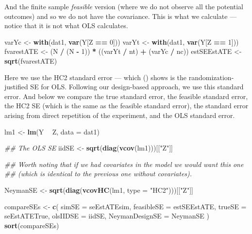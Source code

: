 \documentclass[
  12pt,
]{book}
\newenvironment{Shaded}{\begin{snugshade}}{\end{snugshade}}
\newcommand{\CommentTok}[1]{\textcolor[rgb]{0.56,0.35,0.01}{\textit{#1}}}
\newcommand{\DataTypeTok}[1]{\textcolor[rgb]{0.13,0.29,0.53}{#1}}
\newcommand{\DecValTok}[1]{\textcolor[rgb]{0.00,0.00,0.81}{#1}}
\newcommand{\KeywordTok}[1]{\textcolor[rgb]{0.13,0.29,0.53}{\textbf{#1}}}
\newcommand{\NormalTok}[1]{#1}
\newcommand{\OperatorTok}[1]{\textcolor[rgb]{0.81,0.36,0.00}{\textbf{#1}}}
\newcommand{\StringTok}[1]{\textcolor[rgb]{0.31,0.60,0.02}{#1}}
\theoremstyle{definition}
\theoremstyle{definition}
\theoremstyle{definition}
\theoremstyle{remark}
\begin{document}
And the finite sample \emph{feasible} version (where we do not observe
all the potential outcomes) and so we do not have the covariance. This
is what we calculate --- notice that it is not what OLS calculates.

\begin{Shaded}
\begin{Highlighting}[]
\NormalTok{varYc <-}\StringTok{ }\KeywordTok{with}\NormalTok{(dat1, }\KeywordTok{var}\NormalTok{(Y[Z }\OperatorTok{==}\StringTok{ }\DecValTok{0}\NormalTok{]))}
\NormalTok{varYt <-}\StringTok{ }\KeywordTok{with}\NormalTok{(dat1, }\KeywordTok{var}\NormalTok{(Y[Z }\OperatorTok{==}\StringTok{ }\DecValTok{1}\NormalTok{]))}
\NormalTok{fvarestATE <-}\StringTok{ }\NormalTok{(N }\OperatorTok{/}\StringTok{ }\NormalTok{(N }\OperatorTok{-}\StringTok{ }\DecValTok{1}\NormalTok{)) }\OperatorTok{*}\StringTok{ }\NormalTok{((varYt }\OperatorTok{/}\StringTok{ }\NormalTok{nt) }\OperatorTok{+}\StringTok{ }\NormalTok{(varYc }\OperatorTok{/}\StringTok{ }\NormalTok{nc))}
\NormalTok{estSEEstATE <-}\StringTok{ }\KeywordTok{sqrt}\NormalTok{(fvarestATE)}
\end{Highlighting}
\end{Shaded}

Here we use the HC2 standard error --- which (\citet{lin_agnostic_2013})
shows is the randomization-justified SE for OLS. Following our
design-based approach, we use this standard error. And below we compare
the true standard error, the feasible standard error, the HC2 SE (which
is the same as the feasible standard error), the standard error arising
from direct repetition of the experiment, and the OLS standard error.

\begin{Shaded}
\begin{Highlighting}[]
\NormalTok{lm1 <-}\StringTok{ }\KeywordTok{lm}\NormalTok{(Y }\OperatorTok{~}\StringTok{ }\NormalTok{Z, }\DataTypeTok{data =}\NormalTok{ dat1)}

\CommentTok{## The OLS SE}
\NormalTok{iidSE <-}\StringTok{ }\KeywordTok{sqrt}\NormalTok{(}\KeywordTok{diag}\NormalTok{(}\KeywordTok{vcov}\NormalTok{(lm1)))[[}\StringTok{"Z"}\NormalTok{]]}

\CommentTok{## Worth noting that if we had covariates in the model we would want this one}
\CommentTok{## (which is identical to the previous one without covariates).}

\NormalTok{NeymanSE <-}\StringTok{ }\KeywordTok{sqrt}\NormalTok{(}\KeywordTok{diag}\NormalTok{(}\KeywordTok{vcovHC}\NormalTok{(lm1, }\DataTypeTok{type =} \StringTok{"HC2"}\NormalTok{)))[[}\StringTok{"Z"}\NormalTok{]]}

\NormalTok{compareSEs <-}\StringTok{ }\KeywordTok{c}\NormalTok{(}
  \DataTypeTok{simSE =}\NormalTok{ seEstATEsim,}
  \DataTypeTok{feasibleSE =}\NormalTok{ estSEEstATE,}
  \DataTypeTok{trueSE =}\NormalTok{ seEstATETrue,}
  \DataTypeTok{olsIIDSE =}\NormalTok{ iidSE,}
  \DataTypeTok{NeymanDesignSE =}\NormalTok{ NeymanSE}
\NormalTok{)}
\KeywordTok{sort}\NormalTok{(compareSEs)}
\end{Highlighting}
\end{Shaded}
\end{document}
